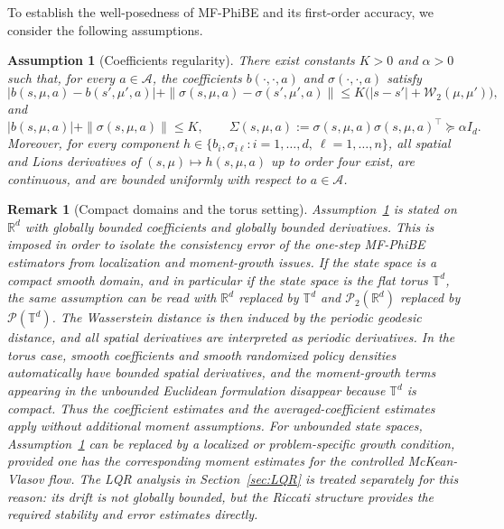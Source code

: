 \documentclass[a4paper, 10pt, english, reqno]{amsart}
\newtheorem{assumptions}[theorem]{Assumption}
\newtheorem{remark}[theorem]{Remark}
\begin{document}
To establish the well-posedness of MF-PhiBE and its first-order accuracy, we consider the following assumptions. 
\begin{assumptions}[Coefficients regularity]
\label{ass:MF-PhiBE-structure}
There exist constants $K>0$ and $\alpha>0$ such that, for every
$a\in\mathcal A$, the coefficients $b(\cdot,\cdot,a)$ and
$\sigma(\cdot,\cdot,a)$ satisfy
\[
|b(s,\mu,a)-b(s',\mu',a)|
+
\|\sigma(s,\mu,a)-\sigma(s',\mu',a)\|
\le
K\bigl(|s-s'|+\mathcal W_2(\mu,\mu')\bigr),
\]
and
\[
|b(s,\mu,a)|+\|\sigma(s,\mu,a)\|
\le
K,
\qquad
\Sigma(s,\mu,a):=\sigma(s,\mu,a)\sigma(s,\mu,a)^\top
\succeq \alpha I_d .
\]
Moreover, for every component
$h\in\{b_i,\sigma_{i\ell}:i=1,\dots,d,\ \ell=1,\dots,n\}$, all spatial
and Lions derivatives of $(s,\mu)\mapsto h(s,\mu,a)$ up to order four
exist, are continuous, and are bounded uniformly with respect to
$a\in\mathcal A$.
\end{assumptions}

\begin{remark}[Compact domains and the torus setting]\label{remark:compact_domains}
Assumption~\ref{ass:MF-PhiBE-structure} is stated on $\mathbb{R}^d$ with globally bounded coefficients and globally bounded derivatives. This is imposed in order to isolate the consistency error of the one-step MF-PhiBE estimators from localization and moment-growth issues. If the state space is a compact smooth domain, and in particular if the state space is the flat torus $\mathbb{T}^d$, the same assumption can be read with $\mathbb{R}^d$ replaced by $\mathbb{T}^d$ and $\mathcal{P}_2(\mathbb{R}^d)$ replaced by $\mathcal{P}(\mathbb{T}^d)$. The Wasserstein distance is then induced by the periodic geodesic distance, and all spatial derivatives are interpreted as periodic derivatives. In the torus case, smooth coefficients and smooth randomized policy densities automatically have bounded spatial derivatives, and the moment-growth terms appearing in the unbounded Euclidean formulation disappear because $\mathbb{T}^d$ is compact. Thus the coefficient estimates and the averaged-coefficient estimates apply without additional moment assumptions. For unbounded state spaces, Assumption~\ref{ass:MF-PhiBE-structure} can be replaced by a localized or problem-specific growth condition, provided one has the corresponding moment estimates for the controlled McKean-Vlasov flow. The LQR analysis in Section~\ref{sec:LQR} is treated separately for this reason: its drift is not globally bounded, but the Riccati structure provides the required stability and error estimates directly.
\end{remark}
\end{document}
